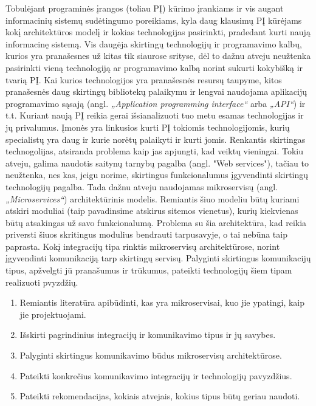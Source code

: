 
Tobulėjant programinės įrangos (toliau PĮ) kūrimo įrankiams ir vis augant informacinių sistemų sudėtingumo poreikiams,
kyla daug klausimų PĮ kūrėjams kokį architektūros modelį ir kokias technologijas pasirinkti, pradedant kurti naują informacinę sistemą.
Vis daugėja skirtingų technologijų ir programavimo kalbų, kurios yra pranašesnes už kitas tik siaurose srityse,
dėl to dažnu atveju neužtenka pasirinkti vieną technologiją ar programavimo kalbą norint sukurti kokybišką ir
tvarią PĮ. Kai kurios technologijos yra pranašesnės resursų taupyme, kitos pranašesnės daug skirtingų bibliotekų palaikymu ir lengvai naudojama
aplikacijų programavimo sąsają (angl. \textit{„Application programming interface“} arba \textit{„API“}) ir t.t.
Kuriant naują PĮ reikia gerai išsianalizuoti tuo metu esamas technologijas ir jų privalumus.
Įmonės yra linkusios kurti PĮ tokiomis technologijomis, kurių specialistų yra daug ir kurie norėtų palaikyti ir kurti jomis.
Renkantis skirtingas technogolijas, atsiranda problema kaip jas apjungti, kad veiktų vieningai.
Tokiu atveju, galima naudotis saitynų tarnybų pagalba (angl. "Web services"), tačiau to neužtenka,
nes kas, jeigu norime, skirtingus funkcionalumus įgyvendinti skirtingų technologijų pagalba.
Tada dažnu atveju naudojamas mikroservisų (angl. \textit{„Microservices“}) architektūrinis modelis. Remiantis šiuo modeliu būtų kuriami atskiri moduliai (taip pavadinsime atskirus sitemos vienetus), kurių
kiekvienas būtų atsakingas už savo funkcionalumą. Problema su šia architektūra, kad reikia priversti šiuos skritingus modulius bendrauti tarpusavyje, o tai nebūna taip paprasta.
Kokį integracijų tipa rinktis mikroservisų architektūrose, norint įgyvendinti komunikaciją tarp skirtingų servisų.
Palyginti skirtingus komunikacijų tipus, apžvelgti jū pranašumus ir trūkumus, pateikti technologijų šiem tipam realizuoti pvyzdžių.
\begin{enumerate}
	\item Remiantis literatūra apibūdinti, kas yra mikroservisai, kuo jie ypatingi, kaip jie projektuojami.
	\item Išskirti pagrindinius integracijų ir komunikavimo tipus ir jų savybes.
	\item Palyginti skirtingus komunikavimo būdus mikroservisų architektūrose.
	\item Pateikti konkrečius komunikavimo integracijų ir technologijų pavyzdžius.
	\item Pateikti rekomendacijas, kokiais atvejais, kokius tipus būtų geriau naudoti.
\end{enumerate}


